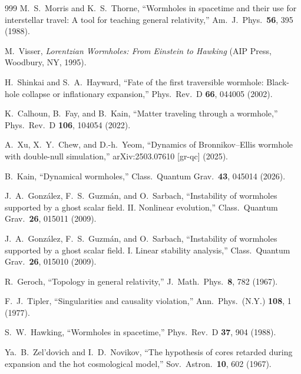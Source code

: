 \documentclass[twocolumn,floatfix,aps,prd,superscriptaddress,nofootinbib,showkeys]{revtex4-2}
\begin{document}
\begin{thebibliography}{999}
M.~S.~Morris and K.~S.~Thorne,
\newblock ``Wormholes in spacetime and their use for interstellar travel: A tool for teaching general relativity,''
\newblock Am.\ J.\ Phys.\ \textbf{56}, 395 (1988).

M.~Visser,
\newblock \emph{Lorentzian Wormholes: From Einstein to Hawking}
\newblock (AIP Press, Woodbury, NY, 1995).

H.~Shinkai and S.~A.~Hayward,
\newblock ``Fate of the first traversible wormhole: Black-hole collapse or inflationary expansion,''
\newblock Phys.\ Rev.\ D \textbf{66}, 044005 (2002).

K.~Calhoun, B.~Fay, and B.~Kain,
\newblock ``Matter traveling through a wormhole,''
\newblock Phys.\ Rev.\ D \textbf{106}, 104054 (2022).

A.~Xu, X.~Y.~Chew, and D.-h.~Yeom,
\newblock ``Dynamics of Bronnikov--Ellis wormhole with double-null simulation,''
\newblock arXiv:2503.07610 [gr-qc] (2025).

B.~Kain,
\newblock ``Dynamical wormholes,''
\newblock Class.\ Quantum Grav.\ \textbf{43}, 045014 (2026).

J.~A.~Gonz\'alez, F.~S.~Guzm\'an, and O.~Sarbach,
\newblock ``Instability of wormholes supported by a ghost scalar field. II. Nonlinear evolution,''
\newblock Class.\ Quantum Grav.\ \textbf{26}, 015011 (2009).

J.~A.~Gonz\'alez, F.~S.~Guzm\'an, and O.~Sarbach,
\newblock ``Instability of wormholes supported by a ghost scalar field. I. Linear stability analysis,''
\newblock Class.\ Quantum Grav.\ \textbf{26}, 015010 (2009).

R.~Geroch,
\newblock ``Topology in general relativity,''
\newblock J.\ Math.\ Phys.\ \textbf{8}, 782 (1967).

F.~J.~Tipler,
\newblock ``Singularities and causality violation,''
\newblock Ann.\ Phys.\ (N.Y.) \textbf{108}, 1 (1977).

S.~W.~Hawking,
\newblock ``Wormholes in spacetime,''
\newblock Phys.\ Rev.\ D \textbf{37}, 904 (1988).

Ya.~B.~Zel'dovich and I.~D.~Novikov,
\newblock ``The hypothesis of cores retarded during expansion and the hot cosmological model,''
\newblock Sov.\ Astron.\ \textbf{10}, 602 (1967).


\end{thebibliography}
\end{document}
